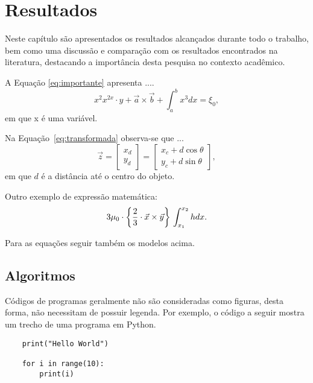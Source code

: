 \chapter{Resultados} \label{resultado}

Neste capítulo são apresentados os resultados alcançados durante todo o trabalho, bem como uma discussão  e comparação com os resultados encontrados na literatura, destacando a importância desta pesquisa no contexto acadêmico.

A Equação \ref{eq:importante}
apresenta ....
%
\begin{equation}
\label{eq:importante}
    x^2      x^{2x} \cdot y + \vec{a}\times \vec{b} + \int_{a}^{b}x^3 dx = \xi_0 ,
\end{equation}
em que x é uma variável.

Na Equação~\ref{eq:transformada} observa-se que ...
%
\begin{equation}
\label{eq:transformada}
\vec{z} = \begin{bmatrix}
x_d 
\\ 
y_d 
\end{bmatrix} = \begin{bmatrix}
x_c + d\cos\theta
\\ 
y_c + d\sin\theta 
\end{bmatrix},
\end{equation}
em que $d$ é a distância até o centro do objeto.

Outro exemplo de expressão matemática:
%
\begin{equation}
   3\mu_0 \cdot \left \{ \frac{2}{3} \cdot \vec{x}\times \vec{y} \right \} \\
   \int_{x_1}^{x_2}hdx .
\end{equation}

Para as equações seguir também os modelos acima.

\section{Algoritmos} 
Códigos de programas geralmente não são consideradas como figuras, desta forma, não necessitam de possuir legenda. Por exemplo, o código a seguir mostra um trecho de uma programa em Python.
\begin{verbatim}
    print("Hello World")

    for i in range(10):
        print(i)
\end{verbatim}

